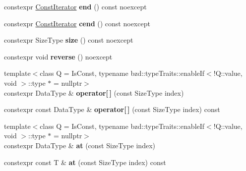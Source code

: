 \begin{DoxyCompactItemize}
\item 
\mbox{\label{classbzd_1_1Span_a3da7f634c328cef8b88a092e23a71518}} 
constexpr \hyperlink{classbzd_1_1iterator_1_1Contiguous}{Const\+Iterator} {\bfseries end} () const noexcept
\item 
\mbox{\label{classbzd_1_1Span_a2baed781fe170f00e00b1e53907b2fb1}} 
constexpr \hyperlink{classbzd_1_1iterator_1_1Contiguous}{Const\+Iterator} {\bfseries cend} () const noexcept
\item 
\mbox{\label{classbzd_1_1Span_adf6b4d628d334aa39cef146885c7dfdd}} 
constexpr Size\+Type {\bfseries size} () const noexcept
\item 
\mbox{\label{classbzd_1_1Span_a184448cd70596a0d1fbe20ac2652a5ea}} 
constexpr void {\bfseries reverse} () noexcept
\item 
\mbox{\label{classbzd_1_1Span_abab84fd06746b5a412fc19540a948014}} 
{\footnotesize template$<$class Q  = Is\+Const, typename bzd\+::type\+Traits\+::enable\+If$<$!\+Q\+::value, void $>$\+::type $\ast$  = nullptr$>$ }\\constexpr Data\+Type \& {\bfseries operator\mbox{[}$\,$\mbox{]}} (const Size\+Type index)
\item 
\mbox{\label{classbzd_1_1Span_ae97940edf6fee163354ff8b2157c96d6}} 
constexpr const Data\+Type \& {\bfseries operator\mbox{[}$\,$\mbox{]}} (const Size\+Type index) const
\item 
\mbox{\label{classbzd_1_1Span_a78d866dc5a3c5801df5a6ee592d59028}} 
{\footnotesize template$<$class Q  = Is\+Const, typename bzd\+::type\+Traits\+::enable\+If$<$!\+Q\+::value, void $>$\+::type $\ast$  = nullptr$>$ }\\constexpr Data\+Type \& {\bfseries at} (const Size\+Type index)
\item 
\mbox{\label{classbzd_1_1Span_a3f77ad40ca29e06e8cc9e978c47ff709}} 
constexpr const T \& {\bfseries at} (const Size\+Type index) const
\item 
\mbox{\label{classbzd_1_1Span_add1510b3f86751b94a2c5976cfceb1ed}} 

\end{DoxyCompactItemize}
